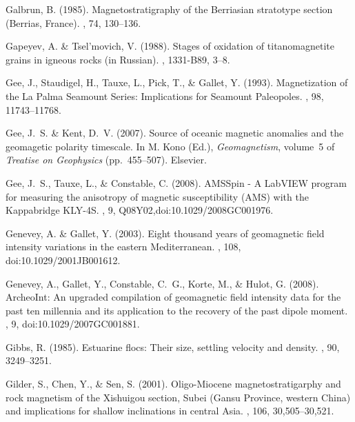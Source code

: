 Galbrun, B. (1985).
\newblock Magnetostratigraphy of the Berriasian stratotype section (Berrias,
  France).
, 74, 130--136.

Gapeyev, A. \& Tsel'movich, V. (1988).
\newblock Stages of oxidation of titanomagnetite grains in igneous rocks (in
  Russian).
, 1331-B89, 3--8.

Gee, J., Staudigel, H., Tauxe, L., Pick, T., \& Gallet, Y. (1993).
\newblock Magnetization of the La Palma Seamount Series: Implications for
  Seamount Paleopoles.
, 98, 11743--11768.

Gee, J.~S. \& Kent, D.~V. (2007).
\newblock Source of oceanic magnetic anomalies and the geomagetic polarity
  timescale.
\newblock In M. Kono (Ed.), {\em Geomagnetism}, volume~5 of {\em Treatise on
  Geophysics}  (pp.\ 455--507). Elsevier.

Gee, J.~S., Tauxe, L., \& Constable, C. (2008).
\newblock AMSSpin - A LabVIEW program for measuring the anisotropy of magnetic
  susceptibility (AMS) with the Kappabridge KLY-4S.
, 9, Q08Y02,doi:10.1029/2008GC001976.

Genevey, A. \& Gallet, Y. (2003).
\newblock Eight thousand years of geomagnetic field intensity variations in the
  eastern Mediterranean.
, 108, doi:10.1029/2001JB001612.

Genevey, A., Gallet, Y., Constable, C.~G., Korte, M., \& Hulot, G. (2008).
\newblock ArcheoInt: An upgraded compilation of geomagnetic field intensity
  data for the past ten millennia and its application to the recovery of the
  past dipole moment.
, 9, doi:10.1029/2007GC001881.

Gibbs, R. (1985).
\newblock Estuarine flocs: Their size, settling velocity and density.
, 90, 3249--3251.

Gilder, S., Chen, Y., \& Sen, S. (2001).
\newblock Oligo-Miocene magnetostratigarphy and rock magnetism of the Xishuigou
  section, Subei (Gansu Province, western China) and implications for shallow
  inclinations in central Asia.
, 106, 30,505--30,521.

